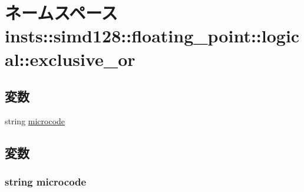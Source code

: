 \hypertarget{namespaceinsts_1_1simd128_1_1floating__point_1_1logical_1_1exclusive__or}{
\section{ネームスペース insts::simd128::floating\_\-point::logical::exclusive\_\-or}
\label{namespaceinsts_1_1simd128_1_1floating__point_1_1logical_1_1exclusive__or}
}
\subsection*{変数}
\begin{DoxyCompactItemize}
\item 
string \hyperlink{namespaceinsts_1_1simd128_1_1floating__point_1_1logical_1_1exclusive__or_a770f11a173e99389a8802f0107ed8f52}{microcode}
\end{DoxyCompactItemize}


\subsection{変数}
\hypertarget{namespaceinsts_1_1simd128_1_1floating__point_1_1logical_1_1exclusive__or_a770f11a173e99389a8802f0107ed8f52}{
\subsubsection[{microcode}]{\setlength{\rightskip}{0pt plus 5cm}string {\bf microcode}}}
\label{namespaceinsts_1_1simd128_1_1floating__point_1_1logical_1_1exclusive__or_a770f11a173e99389a8802f0107ed8f52}
